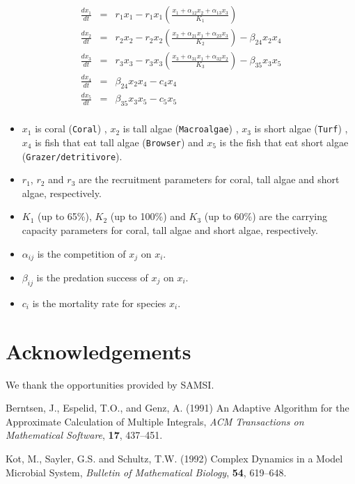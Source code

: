 \documentclass[11pt,twoside]{article}
\numberwithin{equation}{section}
\begin{document}
\begin{eqnarray*}
\frac{d x_1}{dt} &=& r_1 x_1 - r_1 x_1 \left( \frac{ x_1 + \alpha_{12} x_2 + \alpha_{13} x_3}{K_1} \right)  \\
\frac{d x_2}{dt} &=& r_2 x_2 - r_2 x_2 \left( \frac{ x_2 + \alpha_{21} x_1 + \alpha_{23} x_3}{K_2} \right) - \beta_{24} x_2 x_4  \\
\frac{d x_3}{dt} &=& r_3 x_3 - r_3 x_3 \left( \frac{ x_3 + \alpha_{31} x_1 + \alpha_{32} x_2}{K_3} \right) - \beta_{35} x_3 x_5   \\
\frac{d x_4}{dt} &=& \beta_{24} x_2 x_4  - c_4 x_4 \\
\frac{d x_5}{dt} &=& \beta_{35} x_3 x_5  - c_5 x_5 \\
\end{eqnarray*}
\begin{itemize}
  \item $x_1$ is coral (\verb,Coral,) , $x_2$ is tall algae (\verb,Macroalgae,) , $x_3$ is short algae (\verb,Turf,) , $x_4$ is fish that eat tall algae (\verb,Browser,) and $x_5$ is the fish that eat short algae (\verb,Grazer/detritivore,).  
  \item $r_1$, $r_2$ and $r_3$ are the recruitment parameters for coral, tall algae and short algae, respectively.
  \item $K_1$ (up to 65\%), $K_2$ (up to 100\%) and $K_3$ (up to 60\%) are the carrying capacity parameters for coral, tall algae and short algae, respectively.
  \item $\alpha_{ij}$ is the competition of $x_j$ on $x_i$.
  \item $\beta_{ij}$ is the predation success of $x_j$ on $x_i$.
  \item $c_i$ is the mortality rate for species $x_i$.
\end{itemize}
\section*{Acknowledgements}
We thank the opportunities provided by SAMSI. 

\begin{thebibliography}{}
Berntsen, J., Espelid, T.O., and Genz, A. (1991) An Adaptive Algorithm for the Approximate Calculation 
of Multiple Integrals, {\it ACM Transactions on Mathematical Software}, {\bf 17}, 437--451.

Kot, M., Sayler, G.S. and Schultz, T.W. (1992) Complex Dynamics in a Model Microbial System, {\it Bulletin of Mathematical Biology}, {\bf 54}, 619--648.
\end{thebibliography}
\end{document}
